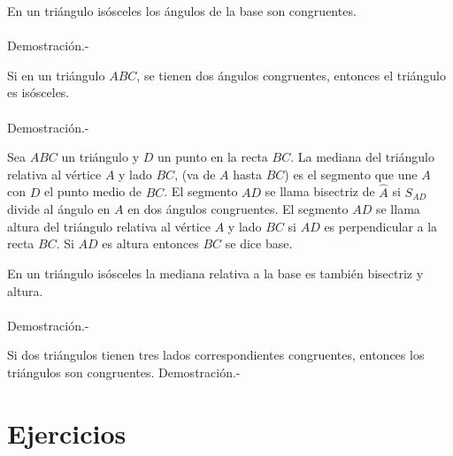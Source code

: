     \begin{proposicion}
	En un triángulo isósceles los ángulos de la base son congruentes.\\\\
	    Demostración.-\;
    \end{proposicion}

    \begin{proposicion}
	Si en un triángulo $ABC$, se tienen dos ángulos congruentes, entonces el triángulo es isósceles.\\\\
	    Demostración.-\;
    \end{proposicion}

\begin{tcolorbox}[colframe=white]
    \begin{def.}
	Sea $ABC$ un triángulo y $D$ un punto en la recta $BC$. La mediana del triángulo relativa al vértice  $A$ y lado $BC$, (va de $A$ hasta $BC$) es el segmento que une $A$ con $D$ el punto medio de $BC$. El segmento $AD$ se llama bisectriz de $\widehat{A}$ si $S_{AD}$ divide al ángulo en $A$ en dos ángulos congruentes. El segmento $AD$ se llama altura del triángulo relativa al vértice $A$ y lado $BC$ si $AD$ es perpendicular a la recta $BC$. Si $AD$ es altura entonces $BC$ se dice base.
    \end{def.}
\end{tcolorbox}

    \begin{proposicion}
	En un triángulo isósceles la mediana relativa a la base es también bisectriz y altura.\\\\
	    Demostración.-\;
    \end{proposicion}

    \begin{teo} Si dos triángulos tienen tres lados correspondientes congruentes, entonces los triángulos son congruentes.
	Demostración.-\;
    \end{teo}

\section{Ejercicios}

